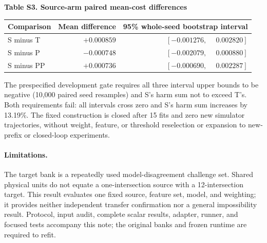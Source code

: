 \documentclass[letterpaper,10pt]{article}
\begin{document}
\begin{center}
\textbf{Table S3. Source-arm paired mean-cost differences}\\[4pt]
\begin{tabular}{@{}lrr@{}}
\toprule
Comparison & Mean difference & 95\% whole-seed bootstrap interval\\
\midrule
S minus T & $+0.000859$ & $[-0.001276,\phantom{+}0.002820]$\\
S minus P & $-0.000748$ & $[-0.002079,\phantom{+}0.000880]$\\
S minus PP & $+0.000736$ & $[-0.000690,\phantom{+}0.002287]$\\
\bottomrule
\end{tabular}
\end{center}
The prespecified development gate requires all three interval upper bounds to be negative (10,000 paired seed resamples) and S's harm sum not to exceed T's. Both requirements fail: all intervals cross zero and S's harm sum increases by 13.19\%. The fixed construction is closed after 15 fits and zero new simulator trajectories, without weight, feature, or threshold reselection or expansion to new-prefix or closed-loop experiments.

\paragraph{Limitations.} The target bank is a repeatedly used model-disagreement challenge set. Shared physical units do not equate a one-intersection source with a 12-intersection target. This result evaluates one fixed source, feature set, model, and weighting; it provides neither independent transfer confirmation nor a general impossibility result. Protocol, input audit, complete scalar results, adapter, runner, and focused tests accompany this note; the original banks and frozen runtime are required to refit.
\end{document}
